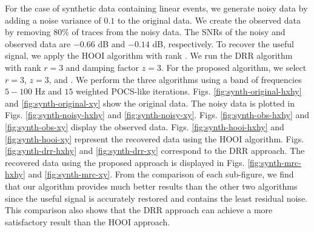 For the case of synthetic data containing linear events, we generate noisy data by adding a noise variance of $0.1$ to the original data. We create the observed data by removing $80\%$ of traces from the noisy data. The SNRs of the noisy and observed data are $ -0.66 $ dB and $ -0.14 $ dB, respectively. To recover the useful signal, we apply the HOOI algorithm with rank . We run the DRR algorithm with rank $r=3$ and damping factor $z=3$. For the proposed  algorithm, we select $r=3$, $z=3$, and . We perform the three algorithms using a band of frequencies $5-100$ Hz and $15$ weighted POCS-like iterations.  Figs. \ref{fig:synth-original-hxhy} and \ref{fig:synth-original-xy} show the original data. The noisy data is plotted in Figs. \ref{fig:synth-noisy-hxhy} and \ref{fig:synth-noisy-xy}. Figs. \ref{fig:synth-obs-hxhy} and \ref{fig:synth-obs-xy} display the observed data. Figs. \ref{fig:synth-hooi-hxhy} and \ref{fig:synth-hooi-xy} represent the recovered data using the HOOI algorithm. Figs. \ref{fig:synth-drr-hxhy} and \ref{fig:synth-drr-xy} correspond to the DRR approach. The recovered data using the proposed  approach is displayed in Figs. \ref{fig:synth-mrc-hxhy} and \ref{fig:synth-mrc-xy}. From the comparison of each sub-figure, we find that our algorithm provides much better results than the other two algorithms since the useful signal is accurately restored and contains the least residual noise. This comparison also shows that the DRR approach can achieve a more satisfactory result than the HOOI approach.


